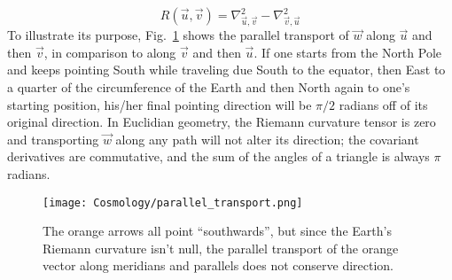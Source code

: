 \begin{equation}
\label{def:riemann_curvature}
R(\vec{u}, \vec{v}) = \nabla^2_{\vec{u}, \vec{v}} - \nabla^2_{\vec{v}, \vec{u}}
\end{equation} To illustrate its purpose, Fig.~\ref{fig:parallel_tranport} shows the parallel transport of $\vec{w}$ along $\vec{u}$ and then $\vec{v}$, in comparison to along $\vec{v}$ and then $\vec{u}$. If one starts from the North Pole and keeps pointing South while traveling due South to the equator, then East to a quarter of the circumference of the Earth and then North again to one's starting position, his/her final pointing direction will be $\pi/2$ radians off of its original direction. In Euclidian geometry, the Riemann curvature tensor is zero and transporting $\vec{w}$ along any path will not alter its direction; the covariant derivatives are commutative, and the sum of the angles of a triangle is always $\pi$ radians.\\

\begin{figure}
\begin{center}
\texttt{[image: Cosmology/parallel\_transport.png]}
\caption{The orange arrows all point ``southwards'', but since the Earth's Riemann curvature isn't null, the parallel transport of the orange vector along meridians and parallels does not conserve direction.}
\label{fig:parallel_tranport}
\end{center}
\end{figure}


